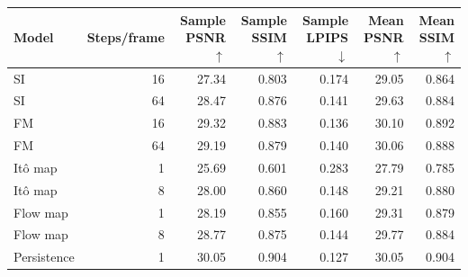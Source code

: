 \begin{tabular}{lrrrrrr}
\toprule
Model & Steps/frame & Sample PSNR$\uparrow$ & Sample SSIM$\uparrow$ & Sample LPIPS$\downarrow$ & Mean PSNR$\uparrow$ & Mean SSIM$\uparrow$ \\
\midrule
SI & 16 & 27.34 & 0.803 & 0.174 & 29.05 & 0.864 \\
SI & 64 & 28.47 & 0.876 & 0.141 & 29.63 & 0.884 \\
FM & 16 & 29.32 & 0.883 & 0.136 & 30.10 & 0.892 \\
FM & 64 & 29.19 & 0.879 & 0.140 & 30.06 & 0.888 \\
It\^o map & 1 & 25.69 & 0.601 & 0.283 & 27.79 & 0.785 \\
It\^o map & 8 & 28.00 & 0.860 & 0.148 & 29.21 & 0.880 \\
Flow map & 1 & 28.19 & 0.855 & 0.160 & 29.31 & 0.879 \\
Flow map & 8 & 28.77 & 0.875 & 0.144 & 29.77 & 0.884 \\
Persistence & 1 & 30.05 & 0.904 & 0.127 & 30.05 & 0.904 \\
\bottomrule
\end{tabular}
